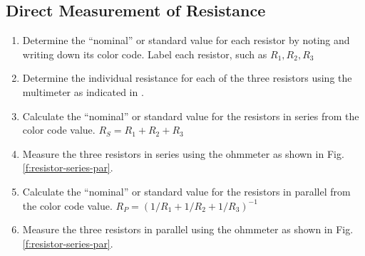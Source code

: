 \subsection{Direct Measurement of Resistance} \label{s:directmsr}
\begin{enumerate}
	\item Determine the ``nominal'' or standard value for each resistor by noting and writing down its color code. Label each resistor, such as $R_1, R_2, R_3$
	\item \label{l:mm} Determine the individual resistance for each of the three resistors using the multimeter as indicated in .
	\item Calculate the ``nominal'' or standard value for the resistors in series from the color code value. $R_S = R_1 + R_2 + R_3$
	\item Measure the three resistors in series using the ohmmeter as shown in Fig. \ref{f:resistor-series-par}.
	\item Calculate the ``nominal'' or standard value for the resistors in parallel from the color code value. $R_P  =  \left( 1/R_1  +  1/R_2  +  1/R_3 \right)^{-1}$
	\item Measure the three resistors in parallel using the ohmmeter as shown in Fig. \ref{f:resistor-series-par}.
\end{enumerate}
	
